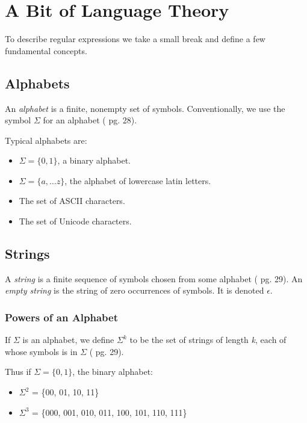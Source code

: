 \documentclass[a4paper,oneside,11pt]{book}
\theoremstyle{definition}
\begin{document}
\section{A Bit of Language Theory}

To describe regular expressions we take a small break and define a few fundamental concepts.

\subsection{Alphabets}

An \emph{alphabet} is a finite, nonempty set of symbols.
Conventionally, we use the symbol $\Sigma$ for an alphabet (\cite{AUTOMATA} pg. 28).

Typical alphabets are:
\begin{itemize}
\item
$\Sigma = \{0, 1\}$, a binary alphabet.

\item
$\Sigma = \{a, \ldots z\}$, the alphabet of lowercase latin letters.

\item
The set of ASCII characters.

\item
The set of Unicode characters.
\end{itemize}

\subsection{Strings}

A \emph{string} is a finite sequence of symbols chosen from some alphabet (\cite{AUTOMATA} pg. 29).
An \emph{empty string} is the string of zero occurrences of symbols. It is denoted $\epsilon$.

\subsubsection{Powers of an Alphabet}

If $\Sigma$ is an alphabet, we define $\Sigma^k$ to be the set of strings of length \emph{k}, each of whose
symbols is in $\Sigma$ (\cite{AUTOMATA} pg. 29).

Thus if $\Sigma = \{0, 1\}$, the binary alphabet:
\begin{itemize}
\item
$\Sigma^2$ = \{00, 01, 10, 11\}

\item
$\Sigma^3$ = \{000, 001, 010, 011, 100, 101, 110, 111\}
\end{itemize}
\end{document}
